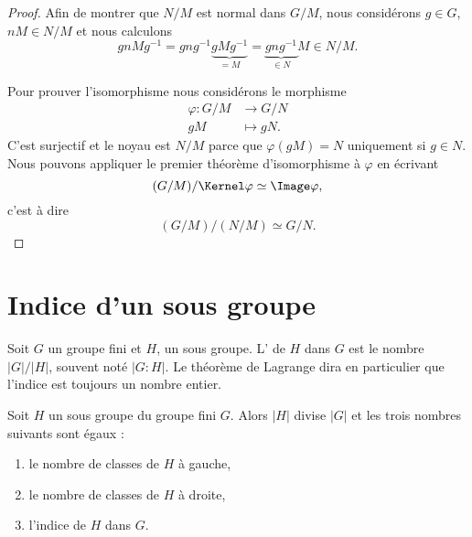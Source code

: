 \begin{proof}
    Afin de montrer que \( N/M\) est normal dans \( G/M\), nous considérons \( g\in G\), \( nM\in N/M\) et nous calculons
    \begin{equation}
        gnMg^{-1}=gng^{-1}\underbrace{gMg^{-1}}_{=M}=\underbrace{gng^{-1}}_{\in N}M\in N/M.
    \end{equation}

    Pour prouver l'isomorphisme nous considérons le morphisme
    \begin{equation}
        \begin{aligned}
            \varphi\colon G/M&\to G/N \\
            gM&\mapsto gN. 
        \end{aligned}
    \end{equation}
    C'est surjectif et le noyau est \( N/M\) parce que \( \varphi(gM)=N\) uniquement si \( g\in N\). Nous pouvons appliquer le premier théorème d'isomorphisme à \( \varphi\) en écrivant
    \begin{equation}
        (G/M)/\Kernel \varphi\simeq\Image \varphi,
    \end{equation}
    c'est à dire
    \begin{equation}
        (G/M)/(N/M)\simeq G/N.
    \end{equation}
\end{proof}

\section{Indice d'un sous groupe}

Soit \( G\) un groupe fini et \( H\), un sous groupe. L' de \( H\) dans \( G\) est le nombre \( | G |/| H |\), souvent noté \( | G:H |\). Le théorème de Lagrange dira en particulier que l'indice est toujours un nombre entier.

\begin{theorem}      \label{ThoLagrange}
    Soit \( H\) un sous groupe du groupe fini \( G\). Alors \( | H |\) divise \( | G |\) et les trois nombres suivants sont égaux :
    \begin{enumerate}
        \item
            le nombre de classes de \( H\) à gauche,
        \item
            le nombre de classes de \( H\) à droite,
        \item
            l'indice de \( H\) dans \( G\).
    \end{enumerate}
\end{theorem}

